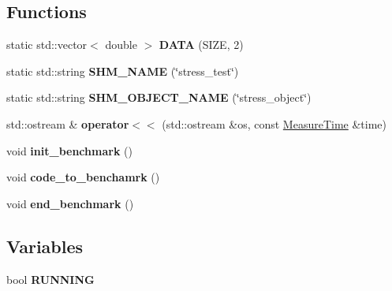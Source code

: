 \subsection*{Functions}
\begin{DoxyCompactItemize}
\item 
static std\+::vector$<$ double $>$ {\bfseries D\+A\+TA} (S\+I\+ZE, 2)\hypertarget{benchmark__common_8hh_a59c33a6b3ce646e26614a12d0193a2bd}{}\label{benchmark__common_8hh_a59c33a6b3ce646e26614a12d0193a2bd}

\item 
static std\+::string {\bfseries S\+H\+M\+\_\+\+N\+A\+ME} (\char`\"{}stress\+\_\+test\char`\"{})\hypertarget{benchmark__common_8hh_a2eab504a26ce27f25dc75a77486f0291}{}\label{benchmark__common_8hh_a2eab504a26ce27f25dc75a77486f0291}

\item 
static std\+::string {\bfseries S\+H\+M\+\_\+\+O\+B\+J\+E\+C\+T\+\_\+\+N\+A\+ME} (\char`\"{}stress\+\_\+object\char`\"{})\hypertarget{benchmark__common_8hh_a7b0c439ad35b06a4ef0180f55a6d005a}{}\label{benchmark__common_8hh_a7b0c439ad35b06a4ef0180f55a6d005a}

\item 
std\+::ostream \& {\bfseries operator$<$$<$} (std\+::ostream \&os, const \hyperlink{structMeasureTime}{Measure\+Time} \&time)\hypertarget{benchmark__common_8hh_a8dd0271b9a992c4b761972f7082052a0}{}\label{benchmark__common_8hh_a8dd0271b9a992c4b761972f7082052a0}

\item 
void {\bfseries init\+\_\+benchmark} ()\hypertarget{benchmark__common_8hh_aa10d0d36e9613185c60cd04e376e12bc}{}\label{benchmark__common_8hh_aa10d0d36e9613185c60cd04e376e12bc}

\item 
void {\bfseries code\+\_\+to\+\_\+benchamrk} ()\hypertarget{benchmark__common_8hh_a91d65608f8757f45d8db7c6e58dfe9f4}{}\label{benchmark__common_8hh_a91d65608f8757f45d8db7c6e58dfe9f4}

\item 
void {\bfseries end\+\_\+benchmark} ()\hypertarget{benchmark__common_8hh_a3ae3ecd5464dfa055c802feb243e62d9}{}\label{benchmark__common_8hh_a3ae3ecd5464dfa055c802feb243e62d9}

\end{DoxyCompactItemize}
\subsection*{Variables}
\begin{DoxyCompactItemize}
\item 
bool {\bfseries R\+U\+N\+N\+I\+NG}\hypertarget{benchmark__common_8hh_a383e703fc3e9dd425f075cf463ee4c5b}{}\label{benchmark__common_8hh_a383e703fc3e9dd425f075cf463ee4c5b}

\end{DoxyCompactItemize}


